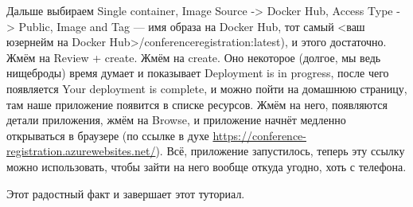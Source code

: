 \documentclass{../../text-style}
\begin{document}
Дальше выбираем Single container, Image Source -> Docker Hub, Access Type -> Public, Image and Tag --- имя образа на Docker Hub, тот самый <ваш юзернейм на Docker Hub>/conferenceregistration:latest), и этого достаточно. Жмём на Review + create. Жмём на create. Оно некоторое (долгое, мы ведь нищеброды) время думает и показывает Deployment is in progress, после чего появляется Your deployment is complete, и можно пойти на домашнюю страницу, там наше приложение появится в списке ресурсов. Жмём на него, появляются детали приложения, жмём на Browse, и приложение начнёт медленно открываться в браузере (по ссылке в духе \url{https://conference-registration.azurewebsites.net/}). Всё, приложение запустилось, теперь эту ссылку можно использовать, чтобы зайти на него вообще откуда угодно, хоть с телефона. 

Этот радостный факт и завершает этот туториал.
\end{document}
